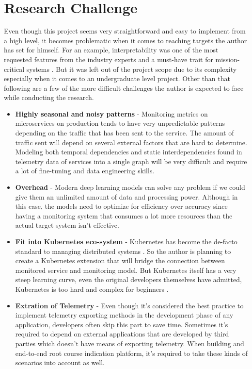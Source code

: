 \section{Research Challenge}

Even though this project seems very straightforward and easy to implement from a high level, it becomes problematic when it comes to reaching targets the author has set for himself. For an example, interpretability was one of the most requested features from the industry experts and a must-have trait for mission-critical systems \citep{ribeiro2016should}. But it was left out of the project scope due to its complexity especially when it comes to an undergraduate level project. Other than that following are a few of the more difficult challenges the author is expected to face while conducting the research.

\begin{itemize}[leftmargin=*] 
    \item \textbf{Highly seasonal and noisy patterns} - Monitoring metrics on microservices on production tends to have very unpredictable patterns depending on the traffic that has been sent to the service. The amount of traffic sent will depend on several external factors that are hard to determine. Modeling both temporal dependencies and static interdependencies found in telemetry data of services into a single graph will be very difficult and require a lot of fine-tuning and data engineering skills.
    \item \textbf{Overhead} - Modern deep learning models can solve any problem if we could give them an unlimited amount of data and processing power. Although in this case, the models need to optimize for efficiency over accuracy since having a monitoring system that consumes a lot more resources than the actual target system isn't effective.
    \item \textbf{Fit into Kubernetes eco-system} - Kubernetes has become the de-facto standard to managing distributed systems \citep{WhatisCo78:online}. So the author is planning to create a Kubernetes extension that will bridge the connection between monitored service and monitoring model. But Kubernetes itself has a very steep learning curve, even the original developers themselves have admitted, Kubernetes is too hard and complex for beginners \citep{Googlead4:online}.
    \item \textbf{Extration of Telemetry} - Even though it's considered the best practice to implement telemetry exporting methods in the development phase of any application, developers often skip this part to save time. Sometimes it's required to depend on external applications that are developed by third parties which doesn't have means of exporting telemetry. When building and end-to-end root course indication platform, it's required to take these kinds of scenarios into account as well.
\end{itemize}
